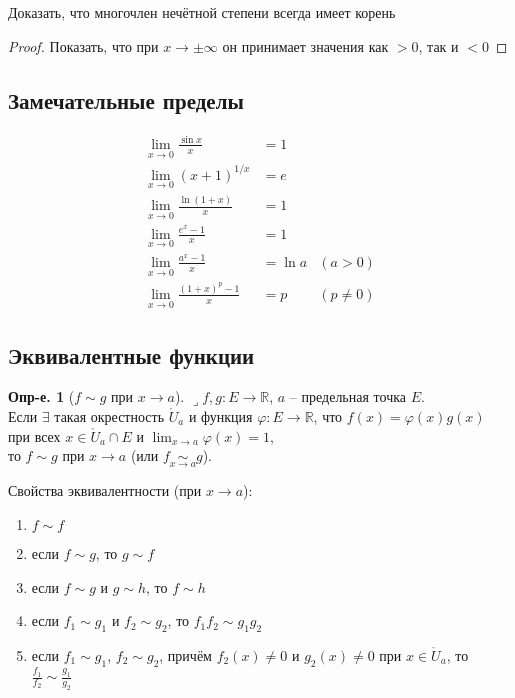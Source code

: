\documentclass[a4paper,12pt]{article}
\numberwithin{figure}{section}
\theoremstyle{definition}
\newtheorem{definition}{Опр-е.}[section]
\theoremstyle{definition}
\def\DS{\displaystyle}
\def\RR{\mathbb{R}}
\def\on{\!:}
\def\ringU{\mathring{U}}
\def\lets{{\huge$\lrcorner$}\space}
\begin{document}
\bigskip
\begin{problem}Доказать, что многочлен нечётной степени всегда имеет корень\end{problem}
\begin{proof}Показать, что при $x\to\pm\infty$ он принимает значения как $>0$, так и $<0$\end{proof}


\subsection{Замечательные пределы}

\begin{align*}
	   \lim_{x\to 0} \frac{\sin x}x &= 1
	\\ \lim_{x\to 0} \left(x+1\right)^{1/x} &= e
	\\ \lim_{x\to 0} \frac{\ln(1+x)}x &= 1
	\\ \lim_{x\to 0} \frac{e^x-1}x &= 1
	\\ \lim_{x\to 0} \frac{a^x-1}x &= \ln a    &(a>0)
	\\ \lim_{x\to 0} \frac{(1+x)^p-1}x &= p   &(p \ne 0)
\end{align*}


\subsection{Эквивалентные функции}

\begin{definition}[$f \sim g$ при $x \to a$]
	\lets $f,g\on E\to \RR$, $a$ -- предельная точка $E$. \\
	Если $\exists$ такая окрестность $\ringU_a$ и функция $\varphi\on E\to\RR$,
	что $f(x)=\varphi(x)g(x)$ при всех $x\in\ringU_a\cap E$
	и $\DS \lim_{x\to a}\varphi(x)=1$,\\
	то $f \sim g$ при $x\to a$ (или $\DS f \underset{x\to a}{\sim} g$).
\end{definition}

\medskip
Свойства эквивалентности (при $x \to a$): \begin{enumerate}
	\item $f \sim f$
	\item если $f \sim g$, то $g \sim f$
	\item если $f \sim g$ и $g \sim h$, то $f \sim h$
	\item если $f_1 \sim g_1$ и $f_2 \sim g_2$, то $f_1 f_2 \sim g_1 g_2$
	\item если $f_1 \sim g_1$, $f_2 \sim g_2$, причём
		  $f_2(x)\ne0$ и $g_2(x)\ne0$ при $x\in \ringU_a$,
		  то $\DS \frac{f_1}{f_2} \sim \frac{g_1}{g_2}$
\end{enumerate}
\end{document}
